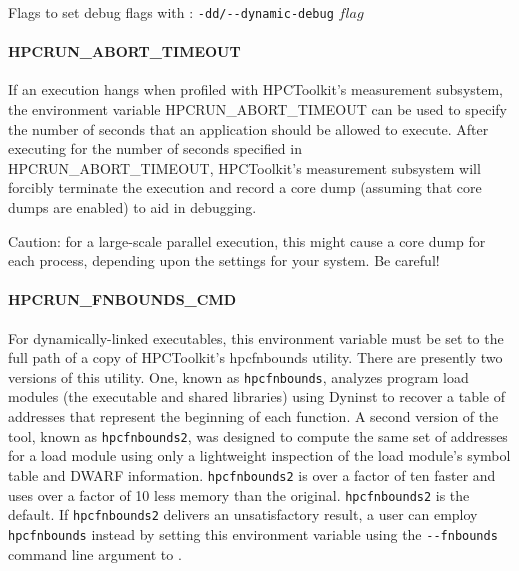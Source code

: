 \parg
Flags to set debug flags with \hpcrun: \verb|-dd/--dynamic-debug| $flag$

\paragraph{HPCRUN\_ABORT\_TIMEOUT}

If an execution hangs when profiled with HPCToolkit's measurement
subsystem, the environment variable HPCRUN\_ABORT\_TIMEOUT can be
used to specify the number of seconds that an application should
be allowed to execute. After executing for the number of seconds
specified in HPCRUN\_ABORT\_TIMEOUT, HPCToolkit's measurement
subsystem will forcibly terminate the execution and record a core
dump (assuming that core dumps are enabled) to aid in debugging.

\parg
Caution: for a large-scale parallel execution, this might cause a
core dump for each process, depending upon the settings for your
system. Be careful!

\paragraph{HPCRUN\_FNBOUNDS\_CMD}

For dynamically-linked executables, this environment variable must
be set to the full path of a copy of HPCToolkit's hpcfnbounds
utility. There are presently two versions of this utility. One, known as \verb|hpcfnbounds|, analyzes program load modules (the executable and shared libraries) using Dyninst to recover a table of addresses that represent the beginning of each function. A second version of the tool, known as \verb|hpcfnbounds2|, was designed to compute  the same set of addresses for a load module using only a lightweight inspection of the load module's symbol table and DWARF information. \verb|hpcfnbounds2| is over a factor of ten faster and uses over a factor of 10 less memory than the original. \verb|hpcfnbounds2|  is the default. If \verb|hpcfnbounds2| delivers an unsatisfactory result, a user can employ \verb|hpcfnbounds| instead by setting this environment variable using the \verb|--fnbounds| command line argument to \hpcrun{}.
